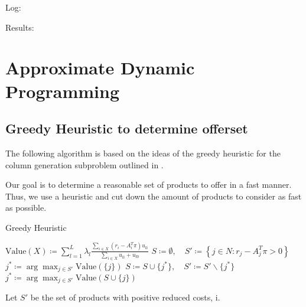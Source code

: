 Log:



Results:



\section{Approximate Dynamic Programming}

\subsection{Greedy Heuristic to determine offerset}

The following algorithm is based on the ideas of the greedy heuristic for the column generation subproblem outlined in \cite{Bront.2009}.

Our goal is to determine a reasonable set of products to offer in a fast manner. Thus, we use a heuristic and cut down the amount of products to consider as fast as possible.


\begin{algorithm}
	\caption{Greedy Heuristic}\label{alg-GreedyHeuristic}
	\begin{algorithmic}[1] %
		\State $\text{Value}(X) \coloneqq \sum_{l=1}^{L} \lambda_l \frac{\sum_{i \in X}(r_i - A_i^T\pi)u_{li}}{\sum_{i \in X}u_{li} + u_{l0}}$
		\State $S\coloneqq \emptyset,\quad S' \coloneqq \left\{j \in N : r_j - A_j^T\pi > 0\right\}$ \label{alg-L1}
		\State $j^* \coloneqq \arg\max_{j \in S'} \text{Value}(\{j\})$
		\Repeat
		\State $S \coloneqq S \cup \{j^*\},\quad S' \coloneqq S'\backslash\{j^*\}$
		\State $j^* \coloneqq \arg \max_{j \in S'} \text{Value}(S \cup \{j\})$
	\end{algorithmic}
\end{algorithm}

Let $S'$ be the set of products with positive reduced costs, i. 